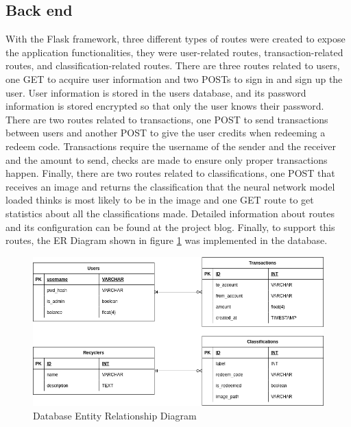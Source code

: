 \documentclass[a4paper,11pt]{article}
\begin{document}
\subsection{Back end}
With the Flask framework, three different types of routes were created to expose the application functionalities, they were user-related routes, transaction-related routes, and classification-related routes.
There are three routes related to users, one GET to acquire user information and two POSTs to sign in and sign up the user. User information is stored in the users database, and its password information is stored encrypted so that only the user knows their password.
There are two routes related to transactions, one POST to send transactions between users and another POST to give the user credits when redeeming a redeem code. Transactions require the username of the sender and the receiver and the amount to send, checks are made to ensure only proper transactions happen.
Finally, there are two routes related to classifications, one POST that receives an image and returns the classification that the neural network model loaded thinks is most likely to be in the image and one GET route to get statistics about all the classifications made. Detailed information about routes and its configuration can be found at the project blog\cite{blog}.
Finally, to support this routes, the ER Diagram shown in figure \ref{fig:er_diagram} was implemented in the database.

\begin{figure}[H]
  \centering
  \includegraphics[width=12.5cm]{Figures/ERDiagram.png}
  \caption{\small{Database Entity Relationship Diagram}}
  \label{fig:er_diagram}
\end{figure}
\end{document}
